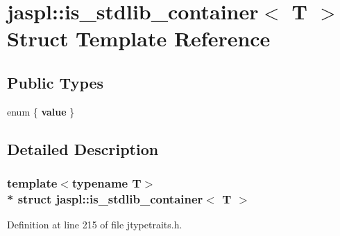 \hypertarget{structjaspl_1_1is__stdlib__container}{}\section{jaspl\+:\+:is\+\_\+stdlib\+\_\+container$<$ T $>$ Struct Template Reference}
\label{structjaspl_1_1is__stdlib__container}
\subsection*{Public Types}
\begin{DoxyCompactItemize}
\item 
enum \{ {\bfseries value}
 \}\hypertarget{structjaspl_1_1is__stdlib__container_a9efc3a54a283db9f7bb0ae6400664ba8}{}\label{structjaspl_1_1is__stdlib__container_a9efc3a54a283db9f7bb0ae6400664ba8}

\end{DoxyCompactItemize}


\subsection{Detailed Description}
\subsubsection*{template$<$typename T$>$\\*
struct jaspl\+::is\+\_\+stdlib\+\_\+container$<$ T $>$}



Definition at line 215 of file jtypetraits.\+h.

